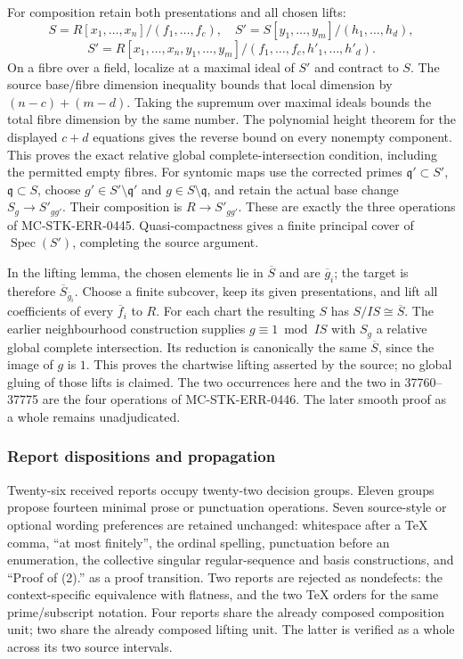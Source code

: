 For composition retain both presentations and all chosen lifts: \[
S=R[x_1,\ldots,x_n]/(f_1,\ldots,f_c),\quad
S'=S[y_1,\ldots,y_m]/(h_1,\ldots,h_d),
\] \[
S'=R[x_1,\ldots,x_n,y_1,\ldots,y_m]/(f_1,\ldots,f_c,h'_1,\ldots,h'_d).
\] On a fibre over a field, localize at a maximal ideal of \(S'\) and contract to \(S\). The source base/fibre dimension inequality bounds that local dimension by \((n-c)+(m-d)\). Taking the supremum over maximal ideals bounds the total fibre dimension by the same number. The polynomial height theorem for the displayed \(c+d\) equations gives the reverse bound on every nonempty component. This proves the exact relative global complete-intersection condition, including the permitted empty fibres. For syntomic maps use the corrected primes \(\mathfrak q'\subset S'\), \(\mathfrak q\subset S\), choose \(g'\in S'\setminus\mathfrak q'\) and \(g\in S\setminus\mathfrak q\), and retain the actual base change \(S_g\to S'_{gg'}\). Their composition is \(R\to S'_{gg'}\). These are exactly the three operations of MC-\AlgebraIdentifierBreak{}STK-\AlgebraIdentifierBreak{}ERR-\AlgebraIdentifierBreak{}0445. Quasi-compactness gives a finite principal cover of \(\operatorname{Spec}(S')\), completing the source argument.

In the lifting lemma, the chosen elements lie in \(\overline S\) and are \(\overline g_i\); the target is therefore \(\overline S_{\overline g_i}\). Choose a finite subcover, keep its given presentations, and lift all coefficients of every \(\overline f_i\) to \(R\). For each chart the resulting \(S\) has \(S/IS\cong\overline S\). The earlier neighbourhood construction supplies \(g\equiv1\bmod IS\) with \(S_g\) a relative global complete intersection. Its reduction is canonically the same \(\overline S\), since the image of \(g\) is \(1\). This proves the chartwise lifting asserted by the source; no global gluing of those lifts is claimed. The two occurrences here and the two in 37760--37775 are the four operations of MC-\AlgebraIdentifierBreak{}STK-\AlgebraIdentifierBreak{}ERR-\AlgebraIdentifierBreak{}0446. The later smooth proof as a whole remains unadjudicated.

\subsubsection{Report dispositions and propagation}\label{algebra-proof-046-report-dispositions-and-propagation}

Twenty-six received reports occupy twenty-two decision groups. Eleven groups propose fourteen minimal prose or punctuation operations. Seven source-style or optional wording preferences are retained unchanged: whitespace after a TeX comma, ``at most finitely'', the ordinal spelling, punctuation before an enumeration, the collective singular regular-sequence and basis constructions, and ``Proof of (2).'' as a proof transition. Two reports are rejected as nondefects: the context-specific equivalence with flatness, and the two TeX orders for the same prime/subscript notation. Four reports share the already composed composition unit; two share the already composed lifting unit. The latter is verified as a whole across its two source intervals.

